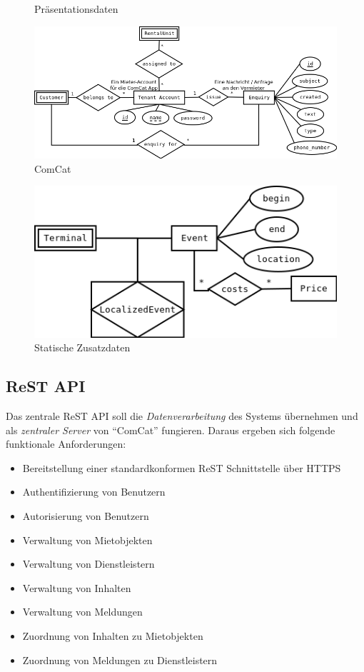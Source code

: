 \documentclass[a4paper]{article}
\begin{document}
\begin{center}
\begin{figure}[h]
		\caption{Präsentationsdaten}
	\end{figure}
	\begin{figure}[h]
		\includegraphics[width=130mm]{comcat.png}
		\caption{ComCat}
	\end{figure}
	\begin{figure}[h]
		\includegraphics[width=130mm]{static_data.png}
		\caption{Statische Zusatzdaten}
	\end{figure}
	\end{center}
	\FloatBarrier
	\subsection{ReST API}
	Das zentrale ReST API soll die \emph{Datenverarbeitung} des Systems übernehmen und als \emph{zentraler Server} von \enquote{ComCat} fungieren.
	Daraus ergeben sich folgende funktionale Anforderungen:
	\begin{itemize}
		\item	Bereitstellung einer standardkonformen ReST Schnittstelle über HTTPS
		\item Authentifizierung von Benutzern
		\item Autorisierung von Benutzern
		\item Verwaltung von Mietobjekten
		\item Verwaltung von Dienstleistern
		\item Verwaltung von Inhalten
		\item Verwaltung von Meldungen
		\item Zuordnung von Inhalten zu Mietobjekten
		\item Zuordnung von Meldungen zu Dienstleistern
	\end{itemize}
\end{document}
